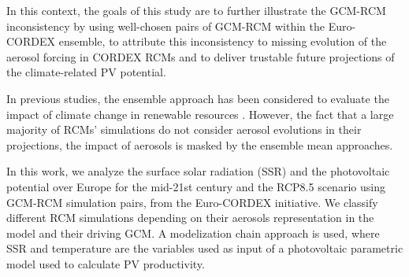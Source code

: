 




   In this context, the goals of this study are to further illustrate the GCM-RCM inconsistency by using well-chosen pairs of GCM-RCM within the Euro-CORDEX ensemble, to attribute this inconsistency to missing evolution of the aerosol forcing in CORDEX RCMs and to deliver trustable future projections of the climate-related PV potential.

In previous studies, the ensemble approach has been considered to evaluate the impact of climate change in renewable resources \cite*{Jerez2015, Tobin2018, Gil2019, Jerez2019}. However, the fact that a large majority of RCMs' simulations do not consider aerosol evolutions in their projections, the impact of aerosols is masked by the ensemble mean approaches.

In this work, we analyze the surface solar radiation (SSR) and the photovoltaic potential over Europe for the mid-21st century and the RCP8.5 scenario using GCM-RCM simulation pairs, from the Euro-CORDEX initiative. We classify different RCM simulations depending on their aerosols representation in the model and their driving GCM. A modelization chain approach is used, where SSR and temperature are the variables used as input of a photovoltaic parametric model used to calculate PV productivity.

   

